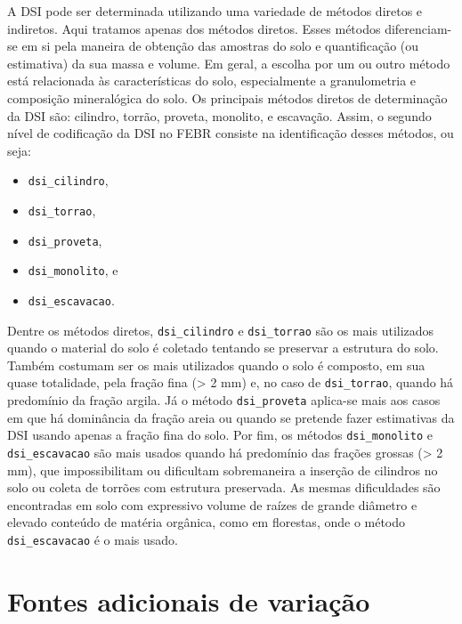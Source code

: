 \documentclass[
]{book}
\providecommand{\tightlist}{%
  \setlength{\itemsep}{0pt}\setlength{\parskip}{0pt}}
\begin{document}
A DSI pode ser determinada utilizando uma variedade de métodos diretos e indiretos. Aqui tratamos apenas dos métodos diretos. Esses métodos diferenciam-se em si pela maneira de obtenção das amostras do solo e quantificação (ou estimativa) da sua massa e volume. Em geral, a escolha por um ou outro método está relacionada às características do solo, especialmente a granulometria e composição mineralógica do solo. Os principais métodos diretos de determinação da DSI são: cilindro, torrão, proveta, monolito, e escavação. Assim, o segundo nível de codificação da DSI no FEBR consiste na identificação desses métodos, ou seja:

\begin{itemize}
\tightlist
\item
  \texttt{dsi\_cilindro},
\item
  \texttt{dsi\_torrao},
\item
  \texttt{dsi\_proveta},
\item
  \texttt{dsi\_monolito}, e
\item
  \texttt{dsi\_escavacao}.
\end{itemize}

Dentre os métodos diretos, \texttt{dsi\_cilindro} e \texttt{dsi\_torrao} são os mais utilizados quando o material do solo é coletado tentando se preservar a estrutura do solo. Também costumam ser os mais utilizados quando o solo é composto, em sua quase totalidade, pela fração fina (\textgreater{} 2 mm) e, no caso de \texttt{dsi\_torrao}, quando há predomínio da fração argila. Já o método \texttt{dsi\_proveta} aplica-se mais aos casos em que há dominância da fração areia ou quando se pretende fazer estimativas da DSI usando apenas a fração fina do solo. Por fim, os métodos \texttt{dsi\_monolito} e \texttt{dsi\_escavacao} são mais usados quando há predomínio das frações grossas (\textgreater{} 2 mm), que impossibilitam ou dificultam sobremaneira a inserção de cilindros no solo ou coleta de torrões com estrutura preservada. As mesmas dificuldades são encontradas em solo com expressivo volume de raízes de grande diâmetro e elevado conteúdo de matéria orgânica, como em florestas, onde o método \texttt{dsi\_escavacao} é o mais usado.

\hypertarget{fontes-adicionais-de-variauxe7uxe3o-1}{%
\section{Fontes adicionais de variação}\label{fontes-adicionais-de-variauxe7uxe3o-1}}
\end{document}
